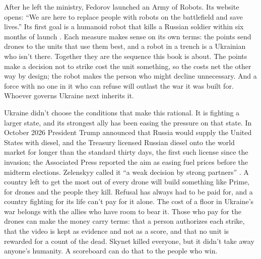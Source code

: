 After he left the ministry, Fedorov launched an Army of Robots. Its website opens: “We are here to replace people with robots on the battlefield and save lives.” Its first goal is a humanoid robot that kills a Russian soldier within six months of launch \autocite{kesteloo2026robots}. Each measure makes sense on its own terms: the points send drones to the units that use them best, and a robot in a trench is a Ukrainian who isn't there. Together they are the sequence this book is about. The points make a decision not to strike cost the unit something, so the costs net the other way by design; the robot makes the person who might decline unnecessary. And a force with no one in it who can refuse will outlast the war it was built for. Whoever governs Ukraine next inherits it.

Ukraine didn't choose the conditions that make this rational. It is fighting a larger state, and its strongest ally has been easing the pressure on that state. In October 2026 President Trump announced that Russia would supply the United States with diesel, and the Treasury licensed Russian diesel onto the world market for longer than the standard thirty days, the first such license since the invasion; the Associated Press reported the aim as easing fuel prices before the midterm elections. Zelenskyy called it “a weak decision by strong partners” \autocite{price2026diesel}. A country left to get the most out of every drone will build something like Prime, for drones and the people they kill. Refusal has always had to be paid for, and a country fighting for its life can't pay for it alone. The cost of a floor in Ukraine's war belongs with the allies who have room to bear it. Those who pay for the drones can make the money carry terms: that a person authorizes each strike, that the video is kept as evidence and not as a score, and that no unit is rewarded for a count of the dead. Skynet killed everyone, but it didn't take away anyone's humanity. A scoreboard can do that to the people who win.
